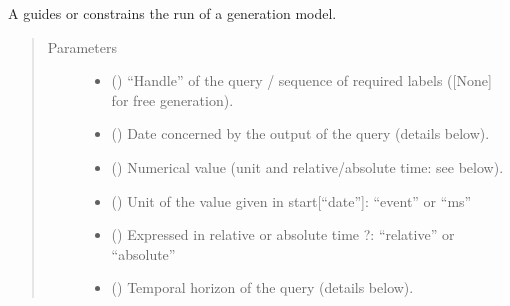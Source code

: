 \documentclass[letterpaper,10pt,english]{sphinxmanual}
\begin{document}
\begin{fulllineitems}
\label{\detokenize{index:Query.Query}}
A  guides or constrains the run of a generation model.
\begin{quote}\begin{description}
\item[{Parameters}] \leavevmode\begin{itemize}
\item {} 
 () \textendash{} “Handle” of the query / sequence of required labels ({[}None{]} for free generation).

\item {} 
 () \textendash{} Date concerned by the output of the query (details below).

\item {} 
\sphinxstyleliteralstrong{{[}}\sphinxstyleliteralstrong{{]}} () \textendash{} Numerical value (unit and relative/absolute time: see below).

\item {} 
\sphinxstyleliteralstrong{{[}}\sphinxstyleliteralstrong{{]}} () \textendash{} Unit of the value given in start{[}“date”{]}: “event” or “ms”

\item {} 
\sphinxstyleliteralstrong{{[}}\sphinxstyleliteralstrong{{]}} () \textendash{} Expressed in relative or absolute time ?: “relative” or “absolute”

\item {} 
 () \textendash{} Temporal horizon of the query (details below).


\end{itemize}
\end{description}
\end{quote}
\end{fulllineitems}
\end{document}
